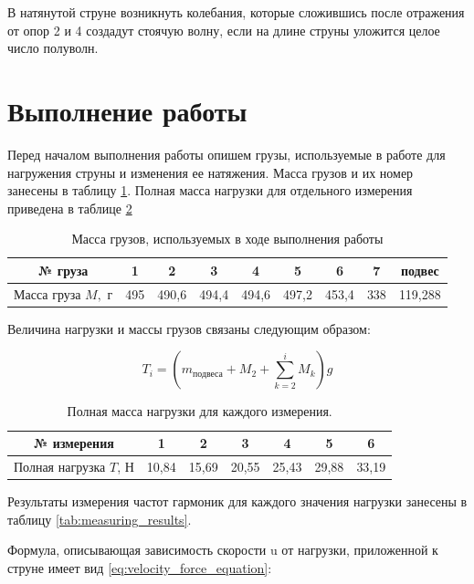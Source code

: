 \documentclass[12pt,a4paper]{article}
\begin{document}
В натянутой струне возникнуть колебания, которые сложившись после отражения от опор 2 и 4 создадут стоячую волну, если на длине струны уложится целое число полуволн.

\section{Выполнение работы}

Перед началом выполнения работы опишем грузы, используемые в работе для нагружения струны и изменения ее натяжения. Масса грузов и их номер занесены в таблицу \ref{tab:mass_of_load}. Полная масса нагрузки для отдельного измерения приведена в таблице \ref{tab:mass_of_load_for_all_measuring}

\begin{table}[h!]
\centering
\begin{tabular}{|c|c|c|c|c|c|c|c|c|}
\hline
№ груза     & 1   & 2     & 3     & 4     & 5     & 6     & 7   & подвес  \\ \hline
Масса груза $M,$ г & 495 & 490,6 & 494,4 & 494,6 & 497,2 & 453,4 & 338 & 119,288 \\ \hline
\end{tabular}
\caption{Масса грузов, используемых в ходе выполнения работы}
\label{tab:mass_of_load}
\end{table}

Величина нагрузки и массы грузов связаны следующим образом:

\begin{equation}
	T_{i} = \left(m_{\text{подвеса}} + M_{2} + \sum_{k=2}^i M_{k}\right)g
\end{equation}

\begin{table}[h!]
\centering
\begin{tabular}{|c|c|c|c|c|c|c|}
\hline
№ измерения        & 1      & 2      & 3      & 4      & 5      & 6      \\ \hline
Полная нагрузка $T$, Н & 10,84 &15,69 &	20,55 &	25,43 &	29,88 &	33,19
 \\ \hline
\end{tabular}
\caption{Полная масса нагрузки для каждого измерения.}
\label{tab:mass_of_load_for_all_measuring}
\end{table}

Результаты измерения частот гармоник для каждого значения нагрузки занесены в таблицу \ref{tab:measuring_results}.

Формула, описывающая зависимость скорости u от нагрузки, приложенной к струне имеет вид \ref{eq:velocity_force_equation}:
\end{document}
